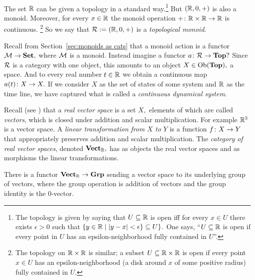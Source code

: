 \documentclass[../main/CT4S-EN-RU]{subfiles}
\begin{document}
\begin{exerciseRUS}\label{exc:points and opens in Top}~
\end{exerciseRUS}

\begin{exampleENG}\label{ex:continuous dynamical systems}
The set ${\mathbb R}$ can be given a topology in a standard way.\footnote{The topology is given by saying that $U\subseteq{\mathbb R}$ is open iff for every $x\in U$ there exists $\epsilon>0$ such that $\{y\in {\mathbb R}{\;|\;} |y-x|<\epsilon\}\subseteq U\}.$ One says, “$U\subseteq{\mathbb R}$ is open if every point in $U$ has an epsilon-neighborhood fully contained in $U$”.} But $({\mathbb R},0,+)$ is also a monoid. Moreover, for every $x\in{\mathbb R}$ the monoid operation $+\colon{\mathbb R}\times{\mathbb R}\rightarrow{\mathbb R}$ is continuous.
\footnote{The topology on ${\mathbb R}\times{\mathbb R}$ is similar; a subset $U\subseteq{\mathbb R}\times{\mathbb R}$ is open if every point $x\in U$ has an epsilon-neighborhood (a disk around $x$ of some positive radius) fully contained in $U.$}
So we say that $\mathcal{R}:=({\mathbb R},0,+)$ is a {\em topological monoid}.

Recall from Section~\ref{sec:monoids as cats} that a monoid action is a functor $\mathcal{M}\rightarrow{\mathbf{Set}},$ where $\mathcal{M}$ is a monoid. Instead imagine a functor $a\colon\mathcal{R}\rightarrow{\mathbf{Top}}?$ Since $\mathcal{R}$ is a category with one object, this amounts to an object $X\in\operatorname{Ob}({\mathbf{Top}}),$ a space. And to every real number $t\in{\mathbb R}$ we obtain a continuous map $a(t)\colon X\rightarrow X.$ If we consider $X$ as the set of states of some system and ${\mathbb R}$ as the time line, we have captured what is called a {\em continuous dynamical system}.
\end{exampleENG}

\begin{exampleRUS}\label{ex:continuous dynamical systems}
\end{exampleRUS}

\begin{exampleENG}
Recall (see \cite{Axl}) that a {\em real vector space} is a set $X,$ elements of which are called {\em vectors}, which is closed under addition and scalar multiplication. For example ${\mathbb R}^3$ is a vector space. A {\em linear transformation from $X$ to $Y$} is a function $f\colon X\rightarrow Y$ that appropriately preserves addition and scalar multiplication. The {\em category of real vector spaces}, denoted ${\mathbf{Vect}}_{\mathbb R},$ has as objects the real vector spaces and as morphisms the linear transformations.

There is a functor ${\mathbf{Vect}}_{\mathbb R}\rightarrow{\mathbf{Grp}}$ sending a vector space to its underlying group of vectors, where the group operation is addition of vectors and the group identity is the 0-vector. 
\end{exampleENG}
\end{document}
